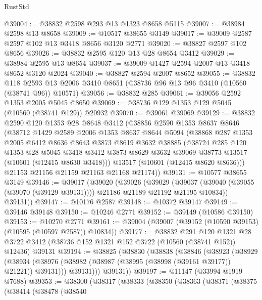 \begin{lexlean}{RustStd}
\begin{coremodule}
@39004 := @38832 @2598 @293 @13 @1323 @8658 @5115
@39007 := @38984 @2598 @13 @8658
@39009 := @10517 @38655 @3149
@39017 := @39009 @2587 @2597 @102 @13 @3418 @8656 @3120 @2771
@39020 := @38827 @2597 @102 @8656
@39026 := @38832 @2595 @120 @13 @28 @8654 @3412
@39029 := @38984 @2595 @13 @8654
@39037 := @39009 @1427 @2594 @2007 @13 @3418 @8652 @3120 @2024
@39040 := @38827 @2594 @2007 @8652
@39055 := @38832
    @118
    @2593
    @13
    @2006
    @3410
    @8651
    (@38736 @96 @13 @96 @3410 (@10560 (@38741 @96)) @10571)
@39056 := @38832 @285
@39061 := @39056 @2592 @1353 @2005 @5045 @8650
@39069 := @38736 @129 @1353 @129 @5045 (@10560 (@38741 @129)) @20932
@39070 := @39061 @39069
@39129 := @38832
    @2590
    @120
    @1353
    @28
    @8648
    @3412
    (@38856
      @2590
      @1353
      @8637
      @8646
      (@38712
        @1429
        @2589
        @2006
        @1353
        @8637
        @8644
        @5094
        (@38868
          @287
          @1353
          @2005
          @6412
          @8636
          @8643
          @3873
          @8619
          @3632
          @38885
          (@38724
            @285
            @120
            @1353
            @28
            @5045
            @3418
            @3412
            @3873
            @8629
            @3632
            @39069
            @38773
            @13517
            (@10601 (@12415 @8630 @3418)))
          @13517
          (@10601 (@12415 @8620 @8636)))
        @21153
        @21156
        @21159
        @21163
        @21168
        @21174))
@39131 := @10577 @38655 @3149
@39146 := @39017
    (@39020
      (@39026
        (@39029
          (@39037 (@39040 (@39055 (@39070 (@39129 @39131)))) @21186 @21189 @21192 @21195 @10834))
        @39131))
@39147 := @10176 @2587
@39148 := @10372 @39147
@39149 := @39146 @39148
@39150 := @10246 @2771
@39152 := @39149 (@10586 @39150)
@39153 := @10270 @2771
@39161 := @39004 (@39007 (@39152 (@10590 @39153) (@10595 (@10597 @2587)) @10834))
@39177 := @38832
    @291
    @120
    @1321
    @28
    @3722
    @3412
    (@38736 @152 @1321 @152 @3722 (@10560 (@38741 @152)) @12436)
    @39131
@39194 := @38825
    (@38830
      (@38838
        (@38846
          (@38923
            (@38929
              (@38934 (@38976 (@38982 (@38987 (@38995 (@38998 (@39161 @39177)) @21221)) @39131)))
              @39131)))
        @39131))
@39197 := @11147 (@33994 @1919 @7688)
@39353 := @38300
    (@38317
      (@38333
        (@38350
          (@38363
            (@38371
              (@38375
                (@38414
                  (@38478
                    (@38540

\end{coremodule}
\end{lexlean}
